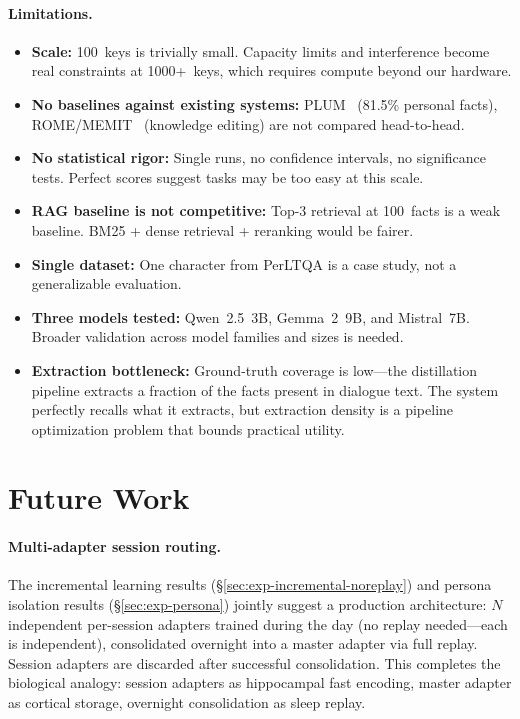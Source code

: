 \documentclass[11pt]{article}
\begin{document}
\paragraph{Limitations.}
\begin{itemize}
    \item \textbf{Scale:} 100~keys is trivially small. Capacity limits and interference become real constraints at 1000+~keys, which requires compute beyond our hardware.
    \item \textbf{No baselines against existing systems:} PLUM~\citep{magister2024plum} (81.5\% personal facts), ROME/MEMIT~\citep{meng2022rome, meng2023memit} (knowledge editing) are not compared head-to-head.
    \item \textbf{No statistical rigor:} Single runs, no confidence intervals, no significance tests. Perfect scores suggest tasks may be too easy at this scale.
    \item \textbf{RAG baseline is not competitive:} Top-3 retrieval at 100~facts is a weak baseline. BM25 + dense retrieval + reranking would be fairer.
    \item \textbf{Single dataset:} One character from PerLTQA is a case study, not a generalizable evaluation.
    \item \textbf{Three models tested:} Qwen~2.5~3B, Gemma~2~9B, and Mistral~7B. Broader validation across model families and sizes is needed.
    \item \textbf{Extraction bottleneck:} Ground-truth coverage is low---the distillation pipeline extracts a fraction of the facts present in dialogue text. The system perfectly recalls what it extracts, but extraction density is a pipeline optimization problem that bounds practical utility.
\end{itemize}

\section{Future Work}
\label{sec:future}

\paragraph{Multi-adapter session routing.}
The incremental learning results (\S\ref{sec:exp-incremental-noreplay}) and persona isolation results (\S\ref{sec:exp-persona}) jointly suggest a production architecture: $N$ independent per-session adapters trained during the day (no replay needed---each is independent), consolidated overnight into a master adapter via full replay.
Session adapters are discarded after successful consolidation.
This completes the biological analogy: session adapters as hippocampal fast encoding, master adapter as cortical storage, overnight consolidation as sleep replay.
\end{document}
